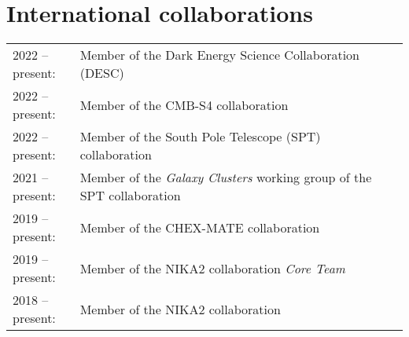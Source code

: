 \section{International collaborations}


\begin{table}[H]
    {\def\arraystretch{1.}\tabcolsep=0pt
        \begin{tabular}{p{0.17\linewidth}p{0.84\linewidth}}

    2022 -- present:
        & Member of the Dark Energy Science Collaboration (DESC) \\

    2022 -- present:
        & Member of the CMB-S4 collaboration \\

    2022 -- present:
        & Member of the South Pole Telescope (SPT) collaboration \\

    2021 -- present:
        & Member of the \textit{Galaxy Clusters} working group of the SPT collaboration \\

    2019 -- present:
        & Member of the CHEX-MATE collaboration \\

    2019 -- present:
        & Member of the NIKA2 collaboration \textit{Core Team} \\

    2018 -- present:
        & Member of the NIKA2 collaboration

    \end{tabular}}
\end{table}
\vspace{-15pt}
